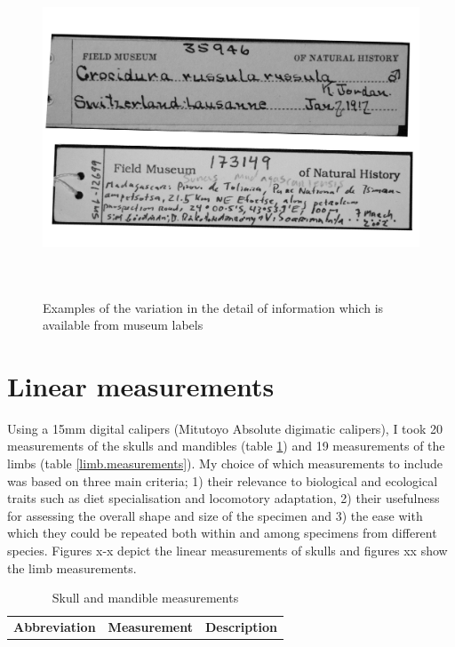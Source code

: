 \begin{figure} 
  \centering
  \includegraphics[width = 30cm, height = 10cm, keepaspectratio=true]{Methods/figures/labels.png}
    \caption[Examples of museum labels]%
    {Examples of the variation in the detail of information which is available from museum labels}%
  \label{fig:museum.labels}
  \end{figure}
  
\section{Linear measurements}

Using a 15mm digital calipers (Mitutoyo Absolute digimatic calipers), I took 20 measurements of the skulls and mandibles (table \ref{tab:sk.measurements}) and 19 measurements of the limbs (table \ref{limb.measurements}). My choice of which measurements to include was based on three main criteria; 1) their relevance to biological and ecological traits such as diet specialisation and locomotory adaptation, 2) their usefulness for assessing the overall shape and size of the specimen and 3) the ease with which they could be repeated both within and among specimens from different species. 
Figures x-x depict the linear measurements of skulls and figures xx show the limb measurements.

\begin{table}[h]
\caption[Description of the skull and mandible measurements]
		{Skull and mandible measurements}%
\begin{tabular}{lll}
\textbf{Abbreviation} & \textbf{Measurement} & \textbf{Description}\\
\end{tabular}
\label{tab:sk.measurements}
\end{table}

